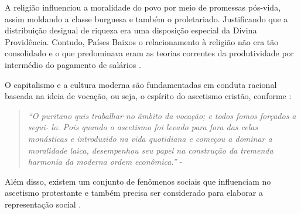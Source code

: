 A religião influenciou a moralidade do povo por meio de promessas pós-vida, assim moldando a classe burguesa e também o proletariado.
Justificando que a distribuição desigual de riqueza era uma disposição especial da Divina Providência.
Contudo, Países Baixos o relacionamento à religião não era tão consolidado e o que predominava eram as teorias correntes da produtividade por intermédio do pagamento de salários \cite{weber}. 

O capitalismo e a cultura moderna são fundamentadas em conduta racional baseada na ideia de vocação, ou seja, o espírito do ascetismo cristão, conforme :

\begin{quotation}
    \textit{
        ``O puritano quis trabalhar no âmbito da vocação; e todos fomos forçados a segui- lo. 
        Pois quando o ascetismo foi levado para fora das celas monásticas e introduzido na vida quotidiana e começou a dominar a moralidade laica, desempenhou seu papel na construção da tremenda harmonia da moderna ordem econômica.''
    } - 
\end{quotation}

Além disso, existem um conjunto de fenômenos sociais que influenciam no ascetismo protestante e também precisa ser considerado para elaborar a representação social \cite{weber}.
